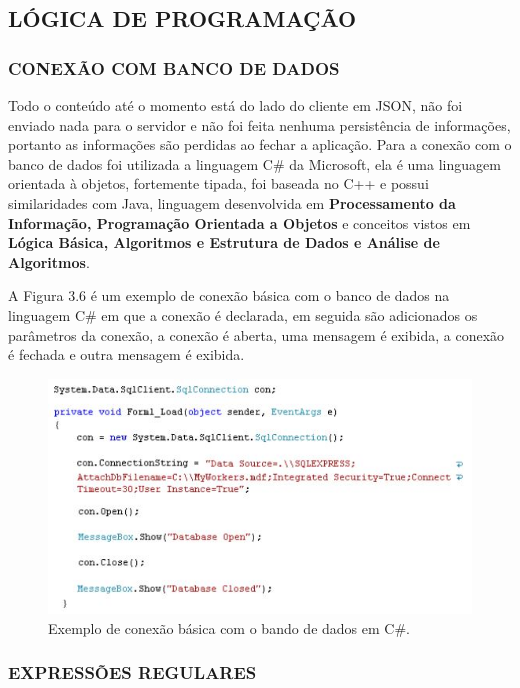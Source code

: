 \documentclass[
  12pt,				%
  openany,
  oneside,
  a4paper,			%
  english,			%
  brazil
]{article}
\numberwithin{figure}{section}
\numberwithin{table}{section}
\begin{document}
\subsection{LÓGICA DE PROGRAMAÇÃO}
\subsubsection{CONEXÃO COM BANCO DE DADOS}

Todo o conteúdo até o momento está do lado do cliente em JSON, não foi enviado nada para o servidor e não foi feita nenhuma persistência de informações, portanto as informações são perdidas ao fechar a aplicação. Para a conexão com o banco de dados foi utilizada a linguagem C\# da Microsoft, ela é uma linguagem orientada à objetos, fortemente tipada, foi baseada no C++ e possui similaridades com Java, linguagem desenvolvida em \textbf{Processamento da Informação, Programação Orientada a Objetos} e conceitos vistos em \textbf{Lógica Básica, Algoritmos e Estrutura de Dados e Análise de Algoritmos}.

A Figura 3.6 é um exemplo de conexão básica com o banco de dados na linguagem C\#
em que a conexão é declarada, em seguida são adicionados os parâmetros da conexão, a conexão é aberta, uma mensagem é exibida, a conexão é fechada e outra mensagem é exibida.

\begin{figure}[!htb]
\centering
\includegraphics[width=1\textwidth]{figura36}
\caption{Exemplo de conexão básica com o bando de dados em C\#.}
\end{figure}



\subsubsection{EXPRESSÕES REGULARES}
\end{document}
